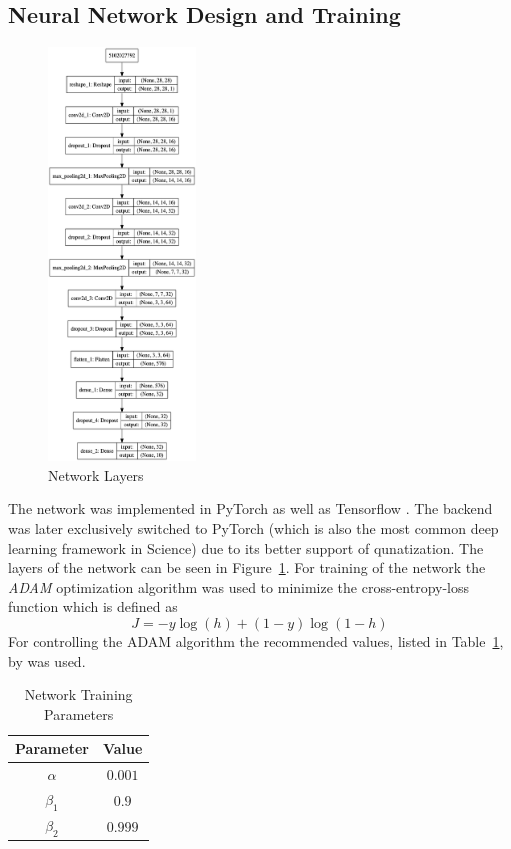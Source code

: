 \subsection{Neural Network Design and Training}
\label{subsec:nntraining}

\begin{figure}
	\centering
    \includegraphics[width=0.35\textwidth]{img/nnlayout}
	\caption{Network Layers}
	\label{fig:network-layers}
\end{figure}

The network was implemented in PyTorch \cite{Paszke:2019aa} as well as Tensorflow \cite{MartinAbadi:2015aa}. The backend was later exclusively switched to PyTorch (which is also the most common deep learning framework in Science) due to its better support of qunatization. The layers of the network can be seen in Figure~\ref{fig:network-layers}. 
For training of the network the \emph{ADAM} optimization algorithm \cite{Kingma:2014aa} was used to minimize the cross-entropy-loss function which is defined as
\begin{equation}
    J = - y  \log(h) + (1-y)  \log(1-h)
\end{equation}
For controlling the ADAM algorithm the recommended values, listed in Table~\ref{tab:train-params}, by \cite{Kingma:2014aa} was used.
\begin{table}[ht]
	\centering
    \caption{Network Training Parameters}
    \begin{tabular}{cc}
        \toprule
            Parameter & Value \\
        \midrule
            $\alpha$   & $0.001$ \\
            $\beta_1$  & $0.9$   \\
            $\beta_2$  & $0.999$  \\          
        \bottomrule
    \end{tabular}
    \label{tab:train-params}
\end{table}
